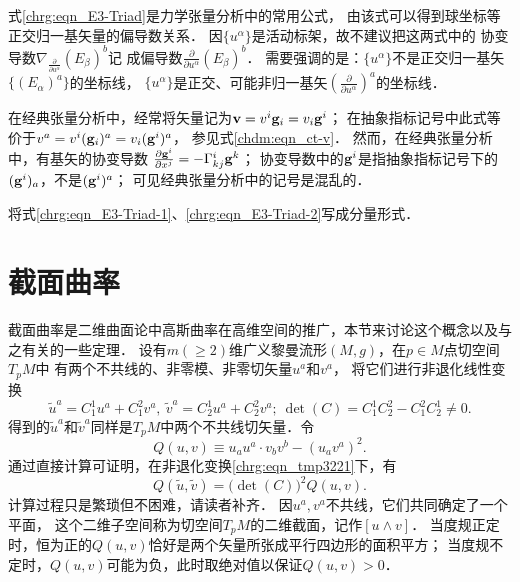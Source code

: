 式\eqref{chrg:eqn_E3-Triad}是力学张量分析中的常用公式，
由该式可以得到球坐标等正交归一基矢量的偏导数关系．
因$\{u^\alpha\}$是活动标架，故不建议把这两式中的
协变导数$\nabla _{\frac{\partial }{\partial u^\alpha}} (E_\beta)^b$记
成偏导数$\frac{\partial }{\partial u^\alpha} (E_\beta)^b$．
需要强调的是：$\{u^\alpha\}$不是正交归一基矢$\{(E_\alpha)^a\}$的坐标线，
$\{u^\alpha\}$是正交、可能非归一基矢$(\frac{\partial }{\partial u^\alpha})^a$的坐标线．


\begin{remark}
	在经典张量分析中，经常将矢量记为${\bf v}= v^i {\bf g}_i = v_i {\bf g}^i$；
	在抽象指标记号中此式等价于$v^a = v^i ({\bf g}_i)^a = v_i ({\bf g}^i)^a$，	参见式\eqref{chdm:eqn_ct-v}．
	然而，在经典张量分析中，有基矢的协变导数
	$\frac{\partial {\bf g}^i}{\partial x^j}=-\Gamma_{kj}^i {\bf g}^k$；
	协变导数中的${\bf g}^i$是指抽象指标记号下的$({\bf g}^i)_a$，不是$({\bf g}^i)^a$；
	可见经典张量分析中的记号是混乱的．
\end{remark}


\begin{exercise}
	将式\eqref{chrg:eqn_E3-Triad-1}、\eqref{chrg:eqn_E3-Triad-2}写成分量形式．
\end{exercise}



\section{截面曲率}\label{chrg:sec_sectional-curvature}
截面曲率是二维曲面论中高斯曲率在高维空间的推广，本节来讨论这个概念以及与之有关的一些定理．
设有$m(\geqslant 2)$维广义黎曼流形$(M,g)$，在$p\in M$点切空间$T_pM$中
有两个不共线的、非零模、非零切矢量$u^a$和$v^a$，
将它们进行非退化线性变换
\begin{equation}\label{chrg:eqn_tmp3221}
    \tilde{u}^a = C_1^1 u^a +C_1^2 v^a, \ \tilde{v}^a = C_2^1 u^a +C_2^2 v^a;
    \ \det(C) = C_1^1C_2^2 - C_1^2 C^1_2\neq 0 .
\end{equation}
得到的$\tilde{u}^a$和$\tilde{v}^a$同样是$T_pM$中两个不共线切矢量．令
\begin{equation}\label{chrg:eqn_tmp3222}
    Q(u,v)\equiv {u}_a{u}^a \cdot {v}_b{v}^b - ({u}_a{v}^a)^2 .
\end{equation}
通过直接计算可证明，在非退化变换\eqref{chrg:eqn_tmp3221}下，有
\begin{equation}\label{chrg:eqn_tmp3223}
    Q(\tilde{u},\tilde{v}) = \bigl(\det(C)\bigr)^2 Q(u,v) .
\end{equation}
计算过程只是繁琐但不困难，请读者补齐．
因$u^a,v^a$不共线，它们共同确定了一个平面，
这个二维子空间称为切空间$T_pM$的{\heiti 二维截面}，记作$[u\wedge v]$．
当度规正定时，恒为正的$Q(u,v)$恰好是两个矢量所张成平行四边形的面积平方；
当度规不定时，$Q(u,v)$可能为负，此时取绝对值以保证$Q(u,v)>0$．

